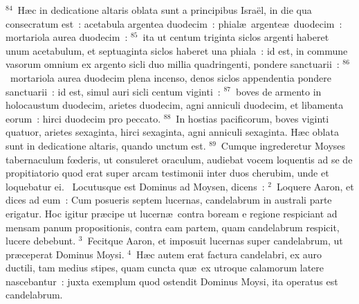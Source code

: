 ${}^{84}$~H\ae c in dedicatione altaris oblata sunt a principibus Isra\"el, in die qua consecratum est~: acetabula argentea duodecim~: phial\ae\ argente\ae\ duodecim~: mortariola aurea duodecim~:
${}^{85}$~ita ut centum triginta siclos argenti haberet unum acetabulum, et septuaginta siclos haberet una phiala~: id est, in commune vasorum omnium ex argento sicli duo millia quadringenti, pondere sanctuarii~:
${}^{86}$~mortariola aurea duodecim plena incenso, denos siclos appendentia pondere sanctuarii~: id est, simul auri sicli centum viginti~:
${}^{87}$~boves de armento in holocaustum duodecim, arietes duodecim, agni anniculi duodecim, et libamenta eorum~: hirci duodecim pro peccato.
${}^{88}$~In hostias pacificorum, boves viginti quatuor, arietes sexaginta, hirci sexaginta, agni anniculi sexaginta. H\ae c oblata sunt in dedicatione altaris, quando unctum est.
${}^{89}$~Cumque ingrederetur Moyses tabernaculum fœderis, ut consuleret oraculum, audiebat vocem loquentis ad se de propitiatorio quod erat super arcam testimonii inter duos cherubim, unde et loquebatur ei.
~Locutusque est Dominus ad Moysen, dicens~:
${}^{2}$~Loquere Aaron, et dices ad eum~: Cum posueris septem lucernas, candelabrum in australi parte erigatur. Hoc igitur pr\ae cipe ut lucern\ae\ contra boream e regione respiciant ad mensam panum propositionis, contra eam partem, quam candelabrum respicit, lucere debebunt.
${}^{3}$~Fecitque Aaron, et imposuit lucernas super candelabrum, ut pr\ae ceperat Dominus Moysi.
${}^{4}$~H\ae c autem erat factura candelabri, ex auro ductili, tam medius stipes, quam cuncta qu\ae\ ex utroque calamorum latere nascebantur~: juxta exemplum quod ostendit Dominus Moysi, ita operatus est candelabrum.


